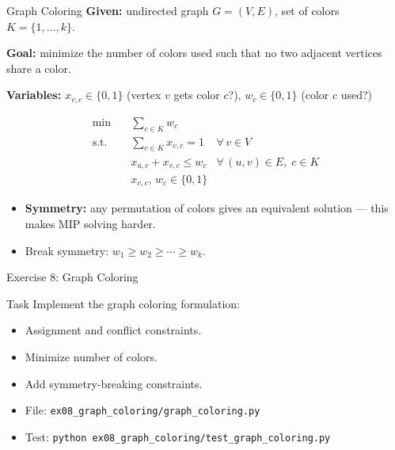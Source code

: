\documentclass[aspectratio=169,10pt]{beamer}
\begin{document}
\begin{frame}{Graph Coloring}
\textbf{Given:} undirected graph $G=(V,E)$, set of colors $K=\{1,\dots,k\}$.

\textbf{Goal:} minimize the number of colors used such that
no two adjacent vertices share a color.

\medskip
\textbf{Variables:} $x_{v,c} \in \{0,1\}$ (vertex $v$ gets color $c$?), \;
$w_c \in \{0,1\}$ (color $c$ used?)

\begin{align*}
  \min \quad & \sum_{c \in K} w_c \\
  \text{s.t.} \quad
    & \sum_{c \in K} x_{v,c} = 1
      & \forall\, v \in V \\
    & x_{u,c} + x_{v,c} \le w_c
      & \forall\, (u,v) \in E,\; c \in K \\
    & x_{v,c},\, w_c \in \{0,1\}
\end{align*}

\medskip
\begin{itemize}
  \item \textbf{Symmetry:} any permutation of colors gives an equivalent
        solution --- this makes MIP solving harder.
  \item Break symmetry: $w_1 \ge w_2 \ge \cdots \ge w_k$.
\end{itemize}
\end{frame}

\begin{frame}{Exercise 8: Graph Coloring}
\begin{block}{Task}
Implement the graph coloring formulation:
\begin{itemize}
  \item Assignment and conflict constraints.
  \item Minimize number of colors.
  \item Add symmetry-breaking constraints.
\end{itemize}
\end{block}
\begin{itemize}
  \item File: \texttt{ex08\_graph\_coloring/graph\_coloring.py}
  \item Test: \texttt{python ex08\_graph\_coloring/test\_graph\_coloring.py}
\end{itemize}
\end{frame}
\end{document}
